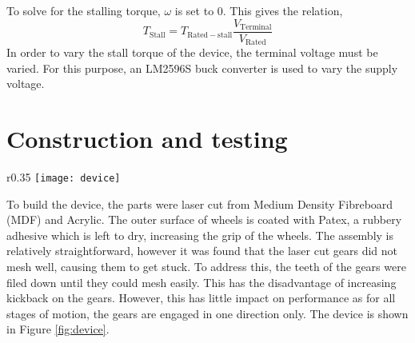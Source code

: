 \noindent To solve for the stalling torque, $\omega$ is set to $0$. This gives the relation,
\begin{equation}
	T_\mathrm{Stall} = T_\mathrm{Rated-stall}\frac{V_\mathrm{Terminal}}{V_\mathrm{Rated}}
\end{equation}
In order to vary the stall torque of the device, the terminal voltage must be varied. For this purpose, an LM2596S buck converter is used to vary the supply voltage.

\section{Construction and testing}\label{sec:construction}

\begin{wrapfigure}{r}{0.35\textwidth}
	\centering
	\texttt{[image: device]}
	\caption{Built device.}
	\label{fig:device}
\end{wrapfigure}

To build the device, the parts were laser cut from Medium Density Fibreboard (MDF) and Acrylic. The outer surface of wheels is coated with Patex, a rubbery adhesive which is left to dry, increasing the grip of the wheels. The assembly is relatively straightforward, however it was found that the laser cut gears did not mesh well, causing them to get stuck. To address this, the teeth of the gears were filed down until they could mesh easily. This has the disadvantage of increasing kickback on the gears. However, this has little impact on performance as for all stages of motion, the gears are engaged in one direction only. The device is shown in Figure \ref{fig:device}.\\


